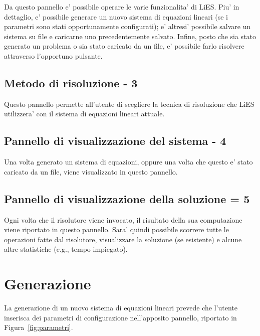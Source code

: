 \documentclass{article}
\begin{document}
Da questo pannello e' possibile operare le varie funzionalita' di LiES. Piu' in dettaglio, e' possibile generare un nuovo sistema di equazioni lineari (se i parametri sono stati opportunamente configurati); e' altresi' possibile salvare un sistema su file e caricarne uno precedentemente salvato. Infine, posto che sia stato generato un problema o sia stato caricato da un file, e' possibile farlo risolvere attraverso l'opportuno pulsante.

\subsection{Metodo di risoluzione - 3}

Questo pannello permette all'utente di scegliere la tecnica di risoluzione che LiES utilizzera' con il sistema di equazioni lineari attuale.

\subsection{Pannello di visualizzazione del sistema - 4}

Una volta generato un sistema di equazioni, oppure una volta che questo e' stato caricato da un file, viene visualizzato in questo pannello.

\subsection{Pannello di visualizzazione della soluzione = 5}

Ogni volta che il risolutore viene invocato, il risultato della sua computazione viene riportato in questo pannello. Sara' quindi possibile scorrere tutte le operazioni fatte dal risolutore, visualizzare la soluzione (se esistente) e alcune altre statistiche (e.g., tempo impiegato).


\section{Generazione}
\label{sec:generazione}

La generazione di un nuovo sistema di equazioni lineari prevede che l'utente inserisca dei parametri di configurazione nell'apposito pannello, riportato in Figura~\ref{fig:parametri}.
\end{document}
